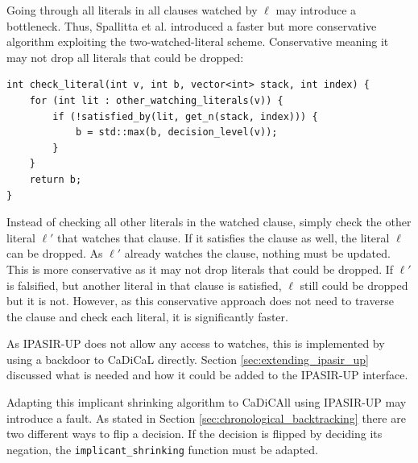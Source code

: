 \documentclass[12pt,a4paper]{article}
\begin{document}
Going through all literals in all clauses watched by \(\ell\) may introduce a bottleneck. Thus, Spallitta et al. \citep{Spallitta_Sebastiani_Biere_2024} introduced a faster but more conservative algorithm exploiting the two-watched-literal scheme. Conservative meaning it may not drop all literals that could be dropped:

\newpage

\begin{verbatim}
int check_literal(int v, int b, vector<int> stack, int index) {
    for (int lit : other_watching_literals(v)) {
        if (!satisfied_by(lit, get_n(stack, index))) {
            b = std::max(b, decision_level(v));
        }
    }
    return b;
}
\end{verbatim}

Instead of checking all other literals in the watched clause, simply check the other literal \(\ell'\) that watches that clause. If it satisfies the clause as well, the literal \(\ell\) can be dropped. As \(\ell'\) already watches the clause, nothing must be updated. This is more conservative as it may not drop literals that could be dropped. If \(\ell'\) is falsified, but another literal in that clause is satisfied, \(\ell\) still could be dropped but it is not. However, as this conservative approach does not need to traverse the clause and check each literal, it is significantly faster.

As IPASIR-UP does not allow any access to watches, this is implemented by using a backdoor to CaDiCaL directly. Section \ref{sec:extending_ipasir_up} discussed what is needed and how it could be added to the IPASIR-UP interface.

Adapting this implicant shrinking algorithm to CaDiCAll using IPASIR-UP may introduce a fault. As stated in Section \ref{sec:chronological_backtracking} there are two different ways to flip a decision. If the decision is flipped by deciding its negation, the \verb|implicant_shrinking| function must be adapted.
\end{document}
